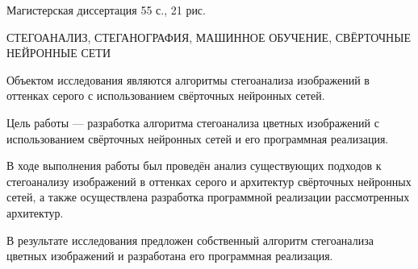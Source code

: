 
Магистерская диссертация 55 с., 21 рис.

СТЕГОАНАЛИЗ, СТЕГАНОГРАФИЯ, МАШИННОЕ ОБУЧЕНИЕ, СВЁРТОЧНЫЕ НЕЙРОННЫЕ СЕТИ

Объектом исследования являются алгоритмы стегоанализа изображений в оттенках серого с использованием свёрточных нейронных сетей.

Цель работы --- разработка алгоритма стегоанализа цветных изображений с использованием свёрточных нейронных сетей и его программная реализация.

В ходе выполнения работы был проведён анализ существующих подходов к стегоанализу изображений в оттенках серого и архитектур свёрточных нейронных сетей, а также осуществлена разработка программной реализации рассмотренных архитектур.

В результате исследования предложен собственный алгоритм стегоанализа цветных изображений и разработана его программная реализация.

\clearpage
